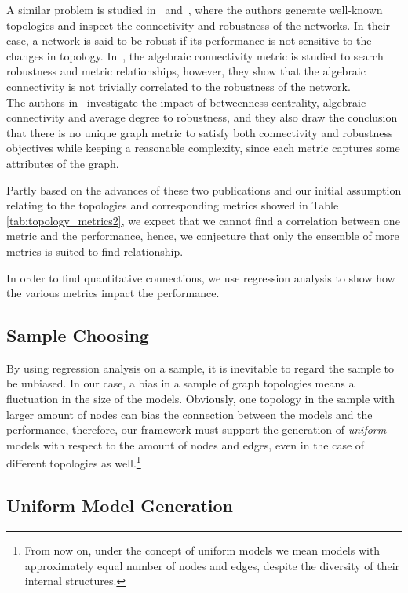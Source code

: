 A similar problem is studied in~\cite{algebraic1} and~\cite{algebraic2}, where the authors generate well-known topologies and inspect the connectivity and robustness of the networks. In their case, a network is said to be robust if its performance is not sensitive to the changes in topology. In~\cite{algebraic1}, the algebraic connectivity metric is studied to search robustness and metric relationships, however, they show that the algebraic connectivity is not trivially correlated to the robustness of the network.\\
The authors in~\cite{algebraic2} investigate the impact of betweenness centrality, algebraic connectivity and average degree to robustness, and they also draw the conclusion that there is no unique graph metric to satisfy both connectivity and robustness objectives while keeping a reasonable complexity, since each metric captures some attributes of the graph.

Partly based on the advances of these two publications and our initial assumption relating to the topologies and corresponding metrics showed in Table \ref{tab:topology_metrics2}, we expect that we cannot find a correlation between one metric and the performance, hence, we conjecture that only the ensemble of more metrics is suited to find relationship.

In order to find quantitative connections, we use regression analysis to show how the various metrics impact the performance. 

\subsection{Sample Choosing}

By using regression analysis on a sample, it is inevitable to regard the sample to be unbiased. In our case, a bias in a sample of graph topologies means a fluctuation in the size of the models. Obviously, one topology in the sample with larger amount of nodes can bias the connection between the models and the performance, therefore, our framework must support the generation of \textit{uniform} models with respect to the amount of nodes and edges, even in the case of different topologies as well.\footnote{From now on, under the concept of uniform models we mean models with approximately equal number of nodes and edges, despite the diversity of their internal structures.}

\subsection{Uniform Model Generation}


